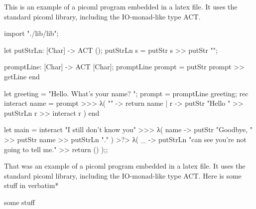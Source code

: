 \documentclass[11pt,a4paper]{paper}
\begin{document}
This is an example of a picoml program embedded in a latex file. It uses the standard
picoml library, including the IO-monad-like type ACT.
\begin{ml}
   import "./lib/lib";
   
   let putStrLn: [Char] -> ACT ();
       putStrLn s = putStr s >> putStr "\n";
       
       promptLine: [Char] -> ACT [Char];
       promptLine prompt = putStr prompt >> getLine
   end
       
   let greeting   = "Hello. What's your name? ";
       prompt     = promptLine greeting;
       rec interact name = 
           prompt >>> 
           λ( "" -> return name
            | r  -> putStr "Hello " >> putStrLn r >> interact r
            ) 
   end
   
   let main = interact "I still don't know you"
       >>>       
       λ( name -> putStr "Goodbye, " >> putStr name >> putStrLn "." )
       >?> 
       λ( _ -> putStrLn "\nI can see you're not going to tell me." 
          >> 
          return () 
         );;
\end{ml}

That was an example of a picoml program embedded in a latex file. It uses the standard
picoml library, including the IO-monad-like type ACT. Here is some stuff in verbatim* 

\begin{verbatim*}
some stuff
\end{verbatim*}
\end{document}

